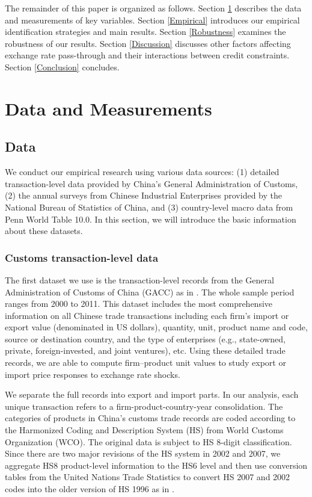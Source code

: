 \documentclass[12pt]{article}
\begin{document}
The remainder of this paper is organized as follows. Section \ref{Data&Measurements} describes the data and measurements of key variables. Section \ref{Empirical} introduces our empirical identification strategies and main results. Section \ref{Robustness} examines the robustness of our results.  Section \ref{Discussion} discusses other factors affecting exchange rate pass-through and their interactions between credit constraints. Section \ref{Conclusion} concludes.

\section{Data and Measurements} \label{Data&Measurements}

\subsection{Data} \label{Data}

We conduct our empirical research using various data sources: (1) detailed transaction-level data provided by China’s General Administration of Customs, (2) the annual surveys from Chinese Industrial Enterprises provided by the National Bureau of Statistics of China, and (3) country-level macro data from Penn World Table 10.0. In this section, we will introduce the basic information about these datasets.

\subsubsection{Customs transaction-level data} \label{Data-Customs}

The first dataset we use is the transaction-level records from the General Administration of Customs of China (GACC) as in \cite{manova-zhang2012}. The whole sample period ranges from 2000 to 2011. This dataset includes the most comprehensive information on all Chinese trade transactions including each firm's import or export value (denominated in US dollars), quantity, unit, product name and code, source or destination country, and the type of enterprises (e.g., state-owned, private, foreign-invested, and joint ventures), etc. Using these detailed trade records, we are able to compute firm–product unit values to study export or import price responses to exchange rate shocks. 

We separate the full records into export and import parts. In our analysis, each unique transaction refers to a firm-product-country-year consolidation. The categories of products in China's customs trade records are coded according to the Harmonized Coding and Description System (HS) from World Customs Organization (WCO). The original data is subject to HS 8-digit classification. Since there are two major revisions of the HS system in 2002 and 2007, we aggregate HS8 product-level information to the HS6 level and then use conversion tables from the United Nations Trade Statistics to convert HS 2007 and 2002 codes into the older version of HS 1996 as in \cite{fan-li-yeaple2015}.
\end{document}
